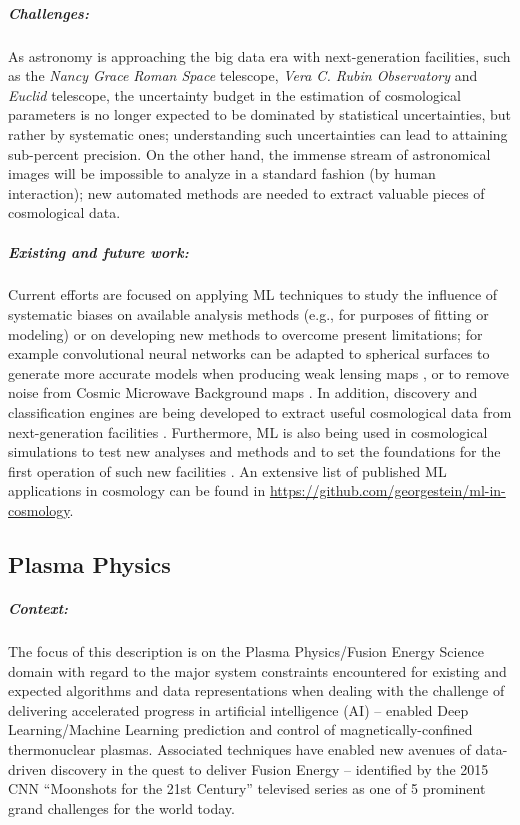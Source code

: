 \subparagraph*{Challenges:} As astronomy is approaching the big data era with next-generation facilities, such as the \textit{Nancy Grace Roman Space} telescope, \textit{Vera C. Rubin Observatory} and \textit{Euclid} telescope, the uncertainty budget in the estimation of cosmological parameters is no longer expected to be dominated by statistical uncertainties, but rather by systematic ones; understanding such uncertainties can lead to attaining sub-percent precision. On the other hand, the immense stream of astronomical images will be impossible to analyze in a standard fashion (by human interaction); new automated methods are needed to extract valuable pieces of cosmological data.
    
\subparagraph*{\textbf{Existing and future work}:} Current efforts are focused on applying ML techniques to study the influence of systematic biases on available analysis methods (e.g., for purposes of fitting or modeling) or on developing new methods to overcome present limitations; for example convolutional neural networks can be adapted to spherical surfaces to generate more accurate models when producing weak lensing maps \cite{Perraudin_2019}, or to remove noise from Cosmic Microwave Background maps \cite{Petroff_2020}. In addition, discovery and classification engines are being developed to extract useful cosmological data from next-generation facilities \citep[][]{Narayan_2018, Mahabal_2019, Forster_2020, Moller_2020}. Furthermore, ML is also being used in cosmological simulations to test new analyses and methods and to set the foundations for the first operation of such new facilities \citep{Kamdar16, Rodriguez18, Villaescusa-Navarro20}. An extensive list of published ML applications in cosmology can be found in \url{https://github.com/georgestein/ml-in-cosmology}.

\subsection{Plasma Physics}


\subparagraph*{Context:} The focus of this description is on the Plasma Physics/Fusion Energy Science domain with regard to the major system constraints encountered for existing and expected algorithms and data representations when dealing with the challenge of delivering accelerated progress in artificial intelligence (AI) – enabled Deep Learning/Machine Learning prediction and control of magnetically-confined thermonuclear plasmas.  Associated techniques have enabled new avenues of data-driven discovery in the quest to deliver Fusion Energy – identified by the 2015 CNN “Moonshots for the 21st Century” televised series as one of 5 prominent grand challenges for the world today.

